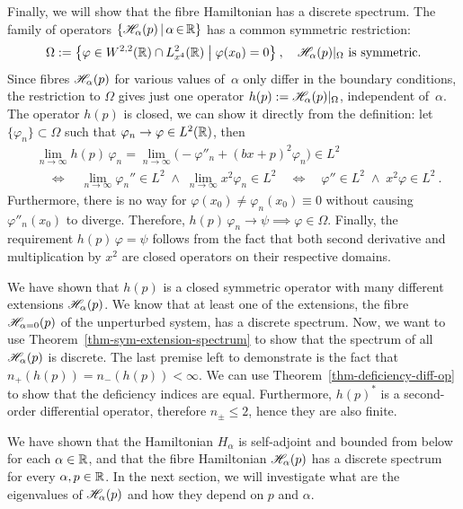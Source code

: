 Finally, we will show that the fibre Hamiltonian has a discrete spectrum. The family of operators $\{  \mathscr{H}_\alpha(p) \, | \, \alpha {\,\in\,} \mathbb{R} \}$ has a common symmetric restriction:
\begin{gather*}
    \Omega := \big\{
        \varphi \in W^{2,2}(\mathbb{R}) \cap L^2_{x^4}(\mathbb{R})
        \;\big|\;
        \varphi(x_0) = 0
    \big\}
    \: ,
    \quad
    \mathscr{H}_\alpha(p) |_\Omega
    \text{ is symmetric.}
\end{gather*}
Since fibres $\mathscr{H}_\alpha(p)$ for various values of~$\alpha$ only differ in the boundary conditions, the restriction to $\Omega$ gives just one operator $h(p) := \mathscr{H}_\alpha(p) |_\Omega$, independent of~$\alpha$. The operator $h(p)$ is closed, we can show it directly from the definition: let $\{ \varphi_n \} \subset \Omega$ such that $\varphi_n \to \varphi \in L^2(\mathbb{R})$, then
\begin{align*}
    &\lim_{n\to\infty} h(p) \, \varphi_n
    = \lim_{n\to\infty} \big( -\varphi''_n + (bx+p)^2 \varphi_n \big)
    \in L^2
    \\[5pt]
    &\quad\Longleftrightarrow\quad
    \lim_{n\to\infty} \varphi_n'' \in L^2
    \;\wedge\;
    \lim_{n\to\infty} x^2 \varphi_n \in L^2
    \quad\Longleftrightarrow\quad
    \varphi'' \in L^2
    \;\wedge\;
    x^2 \varphi  \in L^2
    \: .
\end{align*}
Furthermore, there is no way for $\varphi(x_0) \neq \varphi_n(x_0) \equiv 0$ without causing $\varphi''_n(x_0)$ to diverge. Therefore, $h(p) \, \varphi_n \to \psi \implies \varphi \in \Omega$. Finally, the requirement $h(p) \, \varphi = \psi$ follows from the fact that both second derivative and multiplication by $x^2$ are closed operators on their respective domains.

We have shown that $h(p)$ is a closed symmetric operator with many different extensions $\mathscr{H}_\alpha(p)$. We know that at least one of the extensions, the fibre $\mathscr{H}_{\alpha = 0}(p)$ of the unperturbed system, has a discrete spectrum. Now, we want to use Theorem~\ref{thm-sym-extension-spectrum} to show that the spectrum of all $\mathscr{H}_\alpha(p)$ is discrete. The last premise left to demonstrate is the fact that $n_+(h(p)) = n_-(h(p)) < \infty$. We can use Theorem~\ref{thm-deficiency-diff-op} to show that the deficiency indices are equal. Furthermore, $h(p)^*$ is a second-order differential operator, therefore $n_\pm \leq 2$, hence they are also finite.

We have shown that the Hamiltonian $H_\alpha$ is self-adjoint and bounded from below for each $\alpha\in\mathbb{R}$, and that the fibre Hamiltonian $\mathscr{H}_\alpha(p)$ has a discrete spectrum for every $\alpha, p \in \mathbb{R}$. In the next section, we will investigate what are the eigenvalues of $\mathscr{H}_\alpha(p)$ and how they depend on $p$ and $\alpha$.

